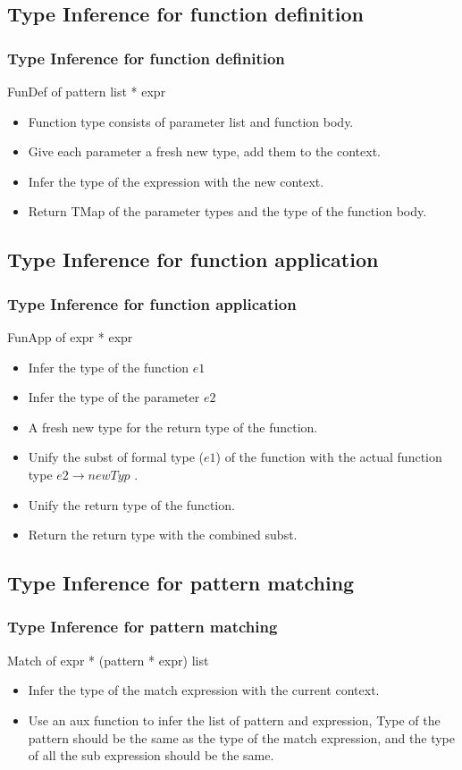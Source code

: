 \documentclass[t]{beamer}
\begin{document}
    \subsection{Type Inference for function definition}
    \begin{frame}
        \frametitle{Type Inference for function definition}
        {\ttfamily FunDef of pattern list * expr}
        \begin{itemize}
            \item Function type consists of parameter list and function body.
            \item Give each parameter a fresh new type, add them to the context.
            \item Infer the type of the expression with the new context.
            \item Return TMap of the parameter types and the type of the function body.
        \end{itemize}
    \end{frame}

    \subsection{Type Inference for function application}
    \begin{frame}
        \frametitle{Type Inference for function application}
        {\ttfamily FunApp of expr * expr}
        \begin{itemize}
            \item Infer the type of the function $e1$
            \item Infer the type of the parameter $e2$
            \item A fresh new type for the return type of the function.
            \item Unify the subst of formal type ($e1$) of the function 
            with the actual function type $e2 \rightarrow newTyp$ .
            \item Unify the return type of the function.
            \item Return the return type with the combined subst.
        \end{itemize}
    \end{frame}

    \subsection{Type Inference for pattern matching}
    \begin{frame}
        \frametitle{Type Inference for pattern matching}
        {\ttfamily Match of expr * (pattern * expr) list}
        \begin{itemize}
            \item Infer the type of the match expression with the current context.
            \item Use an aux function to infer the list of pattern and expression,
            Type of the pattern should be the same as the type of the match expression, 
            and the type of all the sub expression should be the same.
        \end{itemize}
    \end{frame}
\end{document}
